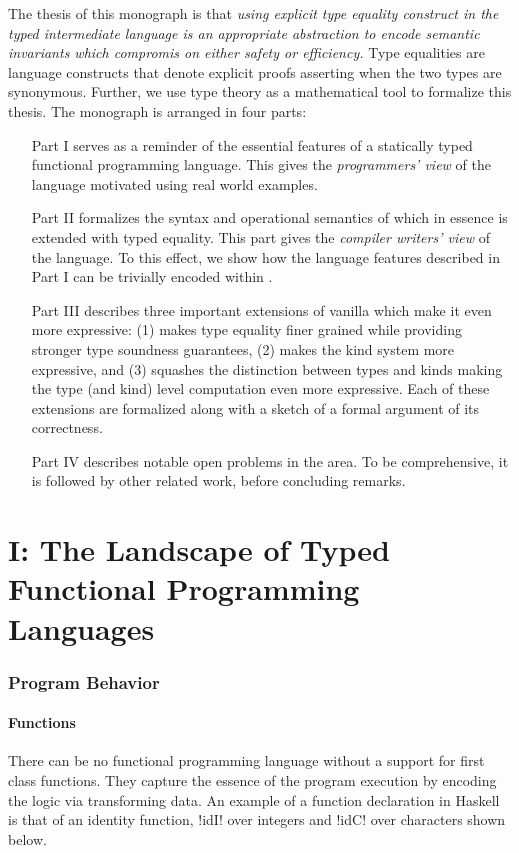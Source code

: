 \documentclass[screen,nonacm,manuscript,review]{acmart} %
\begin{document}
The thesis of this monograph is that \emph{using explicit type
  equality construct in the typed intermediate language is an
  appropriate abstraction to encode semantic invariants which
  compromis on either safety or efficiency.}
Type equalities are language constructs that denote
explicit proofs asserting when the two types are synonymous. Further,
we use type theory as a mathematical tool to formalize this
thesis. The monograph is arranged in four parts:
\begin{enumerate}
\item[Part I] serves as a reminder of the essential features
  of a statically typed functional programming language. This gives
  the \emph{programmers' view} of the language motivated using real
  world examples.
\item[Part II] formalizes the syntax and operational semantics of
  \SFC which in essence is \SF extended with typed equality. This part
  gives the \emph{compiler writers' view} of the language. To this
  effect, we show how the language features described in Part I can be
  trivially encoded within \SFC.
\item[Part III] describes three important extensions of vanilla \SFC
  which make it even more expressive:
  (1) \SFR makes type equality finer grained while
  providing stronger type soundness guarantees, (2) \SFP makes the kind
  system more expressive, and (3) \SFK squashes the distinction between
  types and kinds making the type (and kind) level computation even
  more expressive. Each of these extensions are formalized along with
  a sketch of a formal argument of its correctness.
\item[Part IV] describes notable open problems in the area.
  To be comprehensive, it is followed by other related work, before
  concluding remarks.
\end{enumerate}

\part{I: The Landscape of Typed Functional Programming Languages}\label{part:I}%
\section{Program Behavior}
\subsection{Functions}
There can be no functional programming language without a support for first class
functions. They capture the essence of the program execution by encoding the logic via
transforming data. An example of a function declaration in Haskell is that of an identity
function, !idI! over integers and !idC! over characters shown below.
\end{document}
